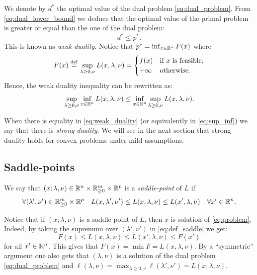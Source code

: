 \documentclass[11pt,nocut]{article}
\begin{document}
We denote by $d^*$ the optimal value of the dual problem \eqref{eq:dual_problem}.
From \eqref{eq:dual_lower_bound} we deduce that the optimal value of the primal problem is greater or equal than the one of the dual problem:
\begin{equation}\label{eq:weak_duality}
	d^* \leq p^*.
\end{equation}
This is known as \emph{weak duality}.
Notice that $p^* = \inf_{x \in \mathbb{R}^n} F(x)$ where
$$
F(x) \overset{\rm def}{=}
\sup_{\lambda \geq 0, \nu} L(x,\lambda,\nu)
=
\begin{cases}
	f(x) & \text{if} \ x \ \text{is feasible},\\
	+ \infty & \text{otherwise.}
\end{cases}
$$
Hence, the weak duality inequality can be rewritten as:
\begin{equation}\label{eq:sup_inf}
	\sup_{\lambda \geq 0, \nu} \inf_{x \in \mathbb{R}^n} L(x,\lambda,\nu) \leq \inf_{x \in \mathbb{R}^n} \sup_{\lambda \geq 0, \nu} L(x,\lambda,\nu).
\end{equation}

When there is equality in \eqref{eq:weak_duality} (or equivalently in \eqref{eq:sup_inf}) we say that there is \emph{strong duality}. We will see in the next section that strong duality holds for convex problems under mild assumptions.


\subsection{Saddle-points}
\begin{definition}
	We say that $(x; \lambda,\nu) \in \mathbb{R}^n \times \mathbb{R}_{\geq 0}^m \times \mathbb{R}^p$ is a \emph{saddle-point} of $L$ if
	\begin{equation}\label{eq:def_saddle}
	\forall (\lambda',\nu') \in \mathbb{R}_{\geq 0}^m \times \mathbb{R}^p \quad
	L(x,\lambda',\nu') \leq L(x,\lambda,\nu) \leq L(x',\lambda,\nu) \quad \forall x' \in \mathbb{R}^n.
\end{equation}
\end{definition}

Notice that if $(x; \lambda,\nu)$ is a saddle point of $L$, then $x$ is solution of \eqref{eq:problem}. Indeed, by taking the supremum over $(\lambda',\nu')$ in \eqref{eq:def_saddle} we get:
$$
F(x) \leq L(x,\lambda,\nu) \leq L(x',\lambda,\nu) \leq F(x')
$$
for all $x' \in \mathbb{R}^n$. 
This gives that $F(x) = \min F = L(x,\lambda,\nu)$.
By a ``symmetric'' argument one also gets that $(\lambda,\nu)$ is a solution of the dual problem \eqref{eq:dual_problem} and $\ell(\lambda,\nu) = \max_{\lambda \geq 0,\nu} \ell(\lambda',\nu') = L(x,\lambda,\nu)$.
\end{document}

